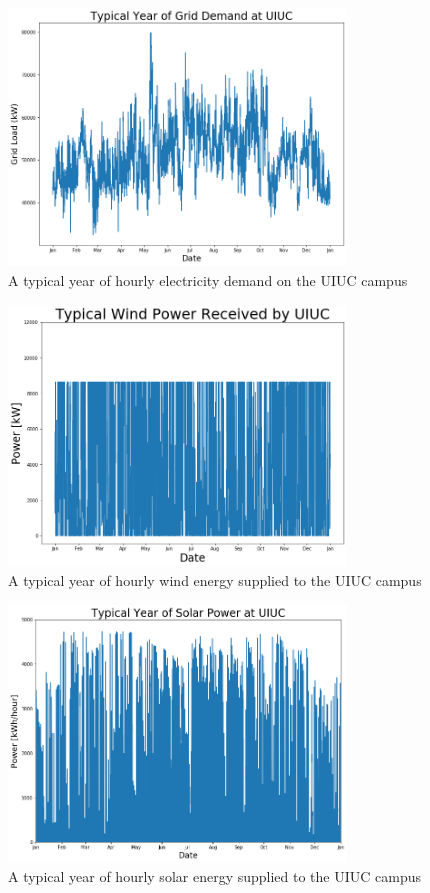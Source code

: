 	\begin{figure}[H]
	  \centering
	  \includegraphics[width=0.8\textwidth]{./figures/typicaldemand.png}
	  \caption{A typical year of hourly electricity demand on the UIUC campus}
	  \label{fig:typelc}
	\end{figure}

	\begin{figure}[H]
	  \centering
	  \includegraphics[width=0.8\textwidth]{./figures/typicalwind.png}
	  \caption{A typical year of hourly wind energy supplied to the UIUC campus}
	  \label{fig:typwind}
	\end{figure}

	\begin{figure}[H]
	  \centering
	  \includegraphics[width=0.8\textwidth]{./figures/typicalsolar.png}
	  \caption{A typical year of hourly solar energy supplied to the UIUC campus}
	  \label{fig:typsol}
	\end{figure}


